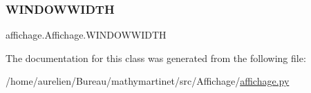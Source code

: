 \mbox{\label{classaffichage_1_1_affichage_aab192d8bb91c1687fb02898a80beecf1}} 
\subsubsection{\texorpdfstring{W\+I\+N\+D\+O\+W\+W\+I\+D\+TH}{WINDOWWIDTH}}
{\footnotesize\ttfamily affichage.\+Affichage.\+W\+I\+N\+D\+O\+W\+W\+I\+D\+TH}



The documentation for this class was generated from the following file\+:\begin{DoxyCompactItemize}
\item 
/home/aurelien/\+Bureau/mathymartinet/src/\+Affichage/\hyperlink{affichage_8py}{affichage.\+py}\end{DoxyCompactItemize}
